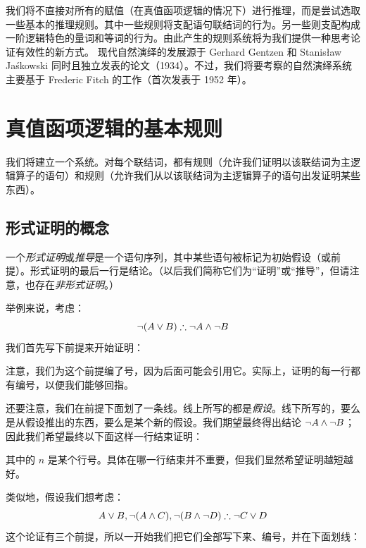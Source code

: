 我们将不直接对所有的赋值（在真值函项逻辑的情况下）进行推理，而是尝试选取一些基本的推理规则。其中一些规则将支配语句联结词的行为。另一些则支配构成一阶逻辑特色的量词和等词的行为。由此产生的规则系统将为我们提供一种思考论证有效性的新方式。
现代自然演绎的发展源于 Gerhard Gentzen 和 Stanis\l{}aw Ja\'{s}kowski 同时且独立发表的论文（1934）。不过，我们将要考察的自然演绎系统主要基于 Frederic Fitch 的工作（首次发表于 1952 年）。

\chapter{真值函项逻辑的基本规则}\label{s:BasicTFL}
我们将建立一个系统。对每个联结词，都有规则（允许我们证明以该联结词为主逻辑算子的语句）和规则（允许我们从以该联结词为主逻辑算子的语句出发证明某些东西）。

\section{形式证明的概念}
一个\emph{形式证明}或\emph{推导}是一个语句序列，其中某些语句被标记为初始假设（或前提）。形式证明的最后一行是结论。（以后我们简称它们为“证明”或“推导”，但请注意，也存在\emph{非形式证明}。）

举例来说，考虑：
	$$\enot (A \eor B) \therefore \enot A \eand \enot B$$
我们首先写下前提来开始证明：


\begin{fitchproof}
	\PR
\end{fitchproof}


注意，我们为这个前提编了号，因为后面可能会引用它。实际上，证明的每一行都有编号，以便我们能够回指。

还要注意，我们在前提下面划了一条线。线上所写的都是\emph{假设}。线下所写的，要么是从假设推出的东西，要么是某个新的假设。我们期望最终得出结论 $\neg A \wedge \neg B$；因此我们希望最终以下面这样一行结束证明：


\begin{fitchproof}
\end{fitchproof}


其中的 $n$ 是某个行号。具体在哪一行结束并不重要，但我们显然希望证明越短越好。

类似地，假设我们想考虑：
$$A\eor B, \enot (A\eand C), \enot (B \eand \enot D) \therefore \enot C\eor D$$
这个论证有三个前提，所以一开始我们把它们全部写下来、编号，并在下面划线：


